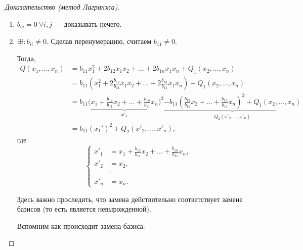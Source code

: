 \documentclass[a4paper]{article}
\begin{document}
\begin{colloq}
\begin{proof}[Доказательство (метод Лагранжа)]
\begin{description}
                    \begin{enumerate}[start=0,label=Случай \arabic*.]
                    \item
                        $b_{ij} = 0 \ \forall i, j$ --- доказывать нечего.
                    \item
                        $\exists i : b_{ii} \neq 0$. Сделав перенумерацию, считаем $b_{11} \neq 0$.

                        Тогда,
                        \begin{align*}
                            Q(x_1, \dots, x_n)
                            &= b_{11} x_1^2 + 2b_{12} x_1 x_2 + \dots + 2 b_{1n} x_1 x_n + Q_1(x_2, \dots, x_n) \\
                            &= b_{11} \left(x_1^2 + 2\frac{b_{12}}{b_{11}} x_1 x_2 + \dots + 2\frac{b_{1n}}{b_{11}} x_1 x_n\right) + Q_1(x_2, \dots, x_n) \\
                            &= b_{11} \Bigg(\underbrace{x_1 + \frac{b_{12}}{b_{11}} x_2 + \dots + \frac{b_{1n}}{b_{11}} x_n}_{x'_1}\Bigg)^2 \underbrace{ - b_{11} \left(\frac{b_{12}}{b_{11}}x_2 + \dots + \frac{b_{1n}}{b_{11}} x_n\right)^2 + Q_1(x_2, \dots, x_n)}_{Q_2(x'_2, \dots, x'_n)} \\
                            &= b_{11} (x_1')^2 + Q_2 (x'_2, \dots, x'_n)
                        ,\end{align*}
                        где
                        \begin{equation*}
                            \begin{cases}
                                x'_1 &= x_1 + \frac{b_{12}}{b_{11}} x_2 + \dots + \frac{b_{1n}}{b_{11}} x_n, \\
                                x'_2 &= x_2, \\
                                     &\vdots \\
                                x'_n &= x_n.
                            \end{cases}
                        \end{equation*}

                        Здесь важно проследить, что замена действительно соответствует замене базисов (то есть является невырожденной).

                        Вспомним как происходит замена базиса:


\end{enumerate}
\end{description}
\end{proof}
\end{colloq}
\end{document}
